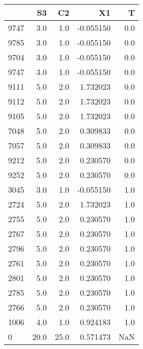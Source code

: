 \begin{tabular}{lrrrr}
\toprule
{} &    S3 &    C2 &        X1 &    T \\
\midrule
9747 &   3.0 &   1.0 & -0.055150 &  0.0 \\
9785 &   3.0 &   1.0 & -0.055150 &  0.0 \\
9704 &   3.0 &   1.0 & -0.055150 &  0.0 \\
9747 &   3.0 &   1.0 & -0.055150 &  0.0 \\
9111 &   5.0 &   2.0 &  1.732023 &  0.0 \\
9112 &   5.0 &   2.0 &  1.732023 &  0.0 \\
9105 &   5.0 &   2.0 &  1.732023 &  0.0 \\
7048 &   5.0 &   2.0 &  0.309833 &  0.0 \\
7057 &   5.0 &   2.0 &  0.309833 &  0.0 \\
9212 &   5.0 &   2.0 &  0.230570 &  0.0 \\
9252 &   5.0 &   2.0 &  0.230570 &  0.0 \\
3045 &   3.0 &   1.0 & -0.055150 &  1.0 \\
2724 &   5.0 &   2.0 &  1.732023 &  1.0 \\
2755 &   5.0 &   2.0 &  0.230570 &  1.0 \\
2767 &   5.0 &   2.0 &  0.230570 &  1.0 \\
2796 &   5.0 &   2.0 &  0.230570 &  1.0 \\
2761 &   5.0 &   2.0 &  0.230570 &  1.0 \\
2801 &   5.0 &   2.0 &  0.230570 &  1.0 \\
2785 &   5.0 &   2.0 &  0.230570 &  1.0 \\
2766 &   5.0 &   2.0 &  0.230570 &  1.0 \\
1006 &   4.0 &   1.0 &  0.924183 &  1.0 \\
0    &  20.0 &  25.0 &  0.571473 &  NaN \\
\bottomrule
\end{tabular}

